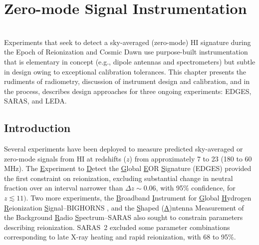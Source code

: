 
%
%

\chapter{Zero-mode Signal Instrumentation}

\begin{bf}
\author{  
L. J. Greenhill 
(Harvard-Smithsonian Center for Astrophysics) \\
R. Subrahmanyan 
(Raman Research Institute)   
}\\



\noindent
Experiments that seek to detect a sky-averaged (zero-mode) HI signature during the Epoch of Reionization and Cosmic Dawn use purpose-built instrumentation that is elementary in concept (e.g., dipole antennas and spectrometers) but subtle in design owing to exceptional calibration tolerances.  This chapter presents the rudiments of radiometry, discussion of instrument design and calibration, and in the process, describes design approaches for three ongoing experiments: EDGES, SARAS, and LEDA. \\

\end{bf}

\section{Introduction}

Several experiments have been deployed to measure predicted sky-averaged or zero-mode signals from HI at redshifts ($z$) from approximately 7 to 23 (180 to 60 MHz). The {\underline E}xperiment to {\underline D}etect the {\underline G}lobal {\underline E}OR {\underline S}ignature (EDGES) \cite{bowman08,rogers12} provided the first constraint on reionization, excluding substantial change in neutral fraction over an interval narrower than $\Delta z\sim 0.06$, with 95\% confidence, for $z\lesssim11)$. Two more experiments, the {\underline B}roadband {\underline I}nstrument for {\underline G}lobal {\underline H}ydrogen {\underline R}eionization {\underline S}ignal--BIGHORNS \cite{sokolowski15}, and the {\underline S}haped (\underline A)ntenna Measurement of the Background {\underline Ra}dio {\underline S}pectrum--SARAS \cite{patra13, singh17, singh18} also sought to constrain parameters describing reionization.  SARAS~2 excluded some parameter combinations corresponding to late X-ray heating and rapid reionization, with 68 to 95\%.  

